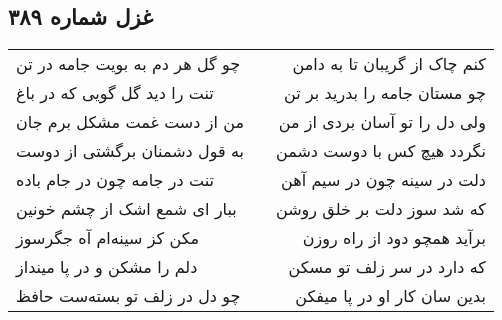 \begin{center}
\section*{غزل شماره ۳۸۹}
\label{sec:sh389}
\begin{longtable}{l p{0.5cm} r}
چو گل هر دم به بویت جامه در تن
&&
کنم چاک از گریبان تا به دامن
\\
تنت را دید گل گویی که در باغ
&&
چو مستان جامه را بدرید بر تن
\\
من از دست غمت مشکل برم جان
&&
ولی دل را تو آسان بردی از من
\\
به قول دشمنان برگشتی از دوست
&&
نگردد هیچ کس با دوست دشمن
\\
تنت در جامه چون در جام باده
&&
دلت در سینه چون در سیم آهن
\\
ببار ای شمع اشک از چشم خونین
&&
که شد سوز دلت بر خلق روشن
\\
مکن کز سینه‌ام آه جگرسوز
&&
برآید همچو دود از راه روزن
\\
دلم را مشکن و در پا مینداز
&&
که دارد در سر زلف تو مسکن
\\
چو دل در زلف تو بسته‌ست حافظ
&&
بدین سان کار او در پا میفکن
\\
\end{longtable}
\end{center}
